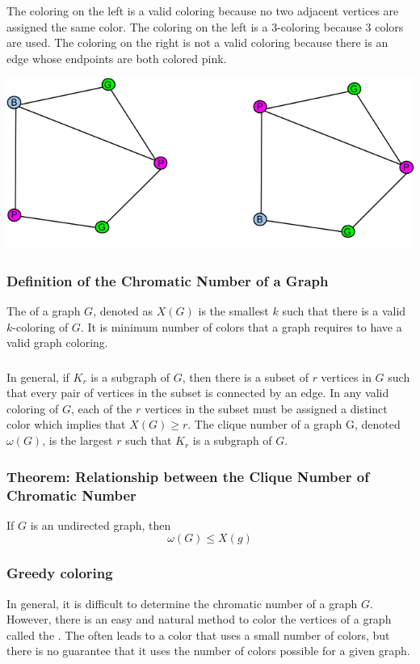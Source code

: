 \subsubsection*{}
The coloring on the left is a valid coloring because no two adjacent vertices are assigned the same color. The coloring on the left is a 3-coloring because 3 colors are used. The coloring on the right is not a valid coloring because there is an edge whose endpoints are both colored pink.
\begin{center}
  \includegraphics[width=0.5\linewidth]{resources/graph colorings.png}
\end{center}

\subsubsection*{Definition of the Chromatic Number of a Graph}
The  of a graph $G$, denoted as $X(G)$ is the smallest $k$ such that there is a valid $k$-coloring of $G$. It is minimum number of colors that a graph requires to have a valid graph coloring.

\subsubsection*{}
In general, if $K_r$ is a subgraph of $G$, then there is a subset of $r$ vertices in $G$ such that every pair of vertices in the subset is connected by an edge. In any valid coloring of $G$, each of the $r$ vertices in the subset must be assigned a distinct color which implies that $X(G) \geq r$. The clique number of a graph G, denoted $\omega(G)$, is the largest $r$ such that $K_r$ is a subgraph of $G$.

\subsubsection*{Theorem: Relationship between the Clique Number of Chromatic Number}
If $G$ is an undirected graph, then
\[
  \omega(G) \leq X(g)
\]

\subsubsection*{Greedy coloring}
In general, it is difficult to determine the chromatic number of a graph $G$. However, there is an easy and natural method to color the vertices of a graph called the . The  often leads to a color that uses a small number of colors, but there is no guarantee that it uses the  number of colors possible for a given graph.

